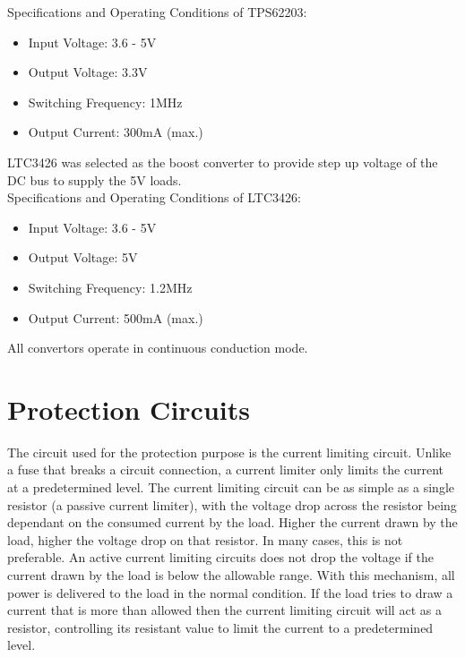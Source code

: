  Specifications and Operating Conditions of TPS62203:
\begin{itemize}
	\item Input Voltage: 3.6 - 5V
	\item Output Voltage:  3.3V
	\item Switching Frequency: 1MHz
	\item Output Current: 300mA (max.)
\end{itemize}


 LTC3426 was selected as the boost converter to provide step up voltage of the DC bus to supply the 5V loads.\\
 
  Specifications and Operating Conditions of LTC3426:
 \begin{itemize}
 	\item Input Voltage: 3.6 - 5V
 	\item Output Voltage: 5V
 	\item Switching Frequency: 1.2MHz
 	\item Output Current: 500mA (max.)
 \end{itemize}
All convertors operate in continuous conduction mode.

\section[BUBO]{Protection Circuits}
The circuit used for the protection purpose is the current limiting circuit. Unlike a
fuse that breaks a circuit connection, a current limiter only limits the current at a
predetermined level. The current limiting circuit can be as simple as a single
resistor (a passive current limiter), with the voltage drop across the resistor being
dependant on the consumed current by the load. Higher the current drawn by the
load, higher the voltage drop on that resistor. In many cases, this is not preferable.
An active current limiting circuits does not drop the voltage if the current drawn by
the load is below the allowable range. With this mechanism, all power is delivered
to the load in the normal condition. If the load tries to draw a current that is more
than allowed then the current limiting circuit will act as a resistor, controlling its
resistant value to limit the current to a predetermined level.